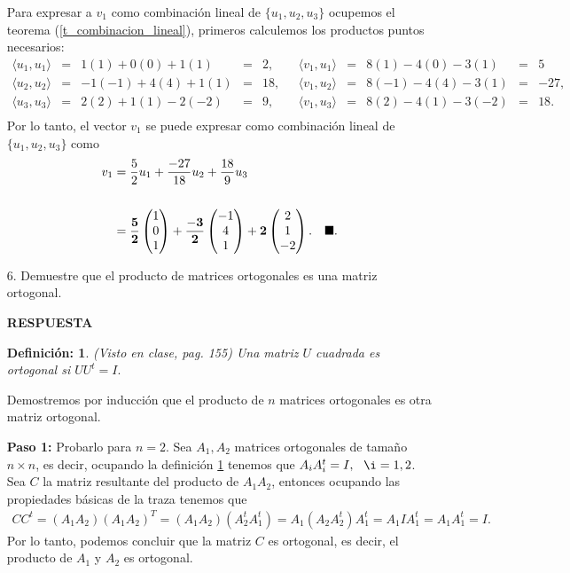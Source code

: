 \documentclass[11pt,letterpaper]{article}
\newcommand{\res}{\textbf{RESPUESTA}\\}
\newcommand{\finf}{\blacksquare.}
\newtheorem{thmd}{Definición:}
\begin{document}
\begin{itemize}
Para expresar a $v_1$ como combinación lineal de $\{u_1, u_2,u_3\}$ ocupemos el teorema (\ref{t_combinacion_lineal}), primeros calculemos los productos puntos necesarios:
\begin{align*}
\langle u_1, u_1 \rangle &=& 1 (1)+0(0)+1(1) &=& 2,\ \ \ & \langle v_1, u_1 \rangle &=& 8(1)-4(0)-3(1) &=& 5\\
\langle u_2, u_2 \rangle &=& -1(-1) +4(4)+1(1)&=&18,\ \ \ & \langle v_1, u_2 \rangle &=& 8(-1) -4(4)-3(1)&=&-27,\\
\langle u_3, u_3 \rangle &=& 2(2)+1(1)-2(-2)&=&9,\ \ \ & \langle v_1, u_3 \rangle &=& 8(2)-4(1)-3(-2)&=&18.\\
\end{align*} 
Por lo tanto, el vector $v_1$ se puede expresar como combinación lineal de $\{u_1, u_2,u_3\}$ como
\begin{align*}
v_1&=\frac{5}{2} u_1+\frac{-27}{18}u_2+\frac{18}{9}u_3\\ \\
&=\bf \frac{5}{2}\begin{pmatrix} 1\\ 0 \\ 1 \end{pmatrix}+\frac{-3}{2}\begin{pmatrix} -1\\ 4 \\ 1 \end{pmatrix}
+2\begin{pmatrix} 2\\ 1 \\ -2 \end{pmatrix}.\ \ \ \finf
\end{align*}

\item[6.] Demuestre que el producto de matrices ortogonales es una matriz ortogonal.

\res \begin{framed}
    \begin{thmd} \label{d_matriz_ortogonal}
	(Visto en clase, pag. 155) Una matriz $U$ cuadrada es ortogonal si $UU^t=I.$
    \end{thmd}
\end{framed}
Demostremos por inducción que el producto de $n$ matrices ortogonales es otra matriz ortogonal.

\textbf{Paso 1:} Probarlo para $n=2$. Sea $A_1, A_2$ matrices ortogonales de tamaño $n\times n$, es decir, ocupando la definición \ref{d_matriz_ortogonal} tenemos que $A_iA_i^t=I, \ \ \i=1,2$. Sea $C$ la matriz resultante del producto de $A_1A_2$, entonces ocupando las propiedades básicas de la traza tenemos que 
\begin{align*}
CC^t=(A_1A_2)(A_1A_2)^T = (A_1A_2)(A_2^tA_1^t)= A_1(A_2 A_2^t)A_1^t=A_1IA_1^t=A_1A_1^t=I.
\end{align*}
Por lo tanto, podemos concluir que la matriz $C$ es ortogonal, es decir, el producto de $A_1$ y $A_2$ es ortogonal. 


\end{itemize}
\end{document}
